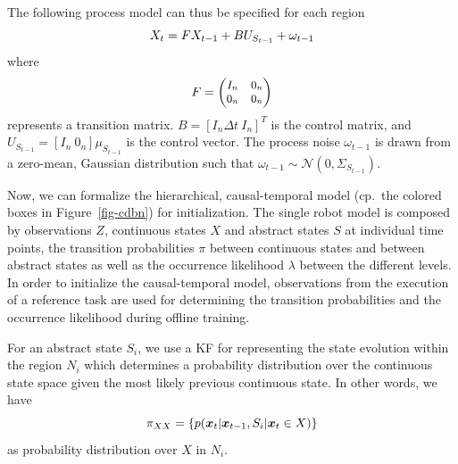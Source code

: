 \documentclass[runningheads]{llncs}
\begin{document}
The following process model can thus be specified for each region
    \begin{equation}
        \small
        X_{t} = FX_{t-1}+BU_{S_{t-1}}+\omega_{t-1}
        \label{eq-process-model}
    \end{equation}
    where 
    \begin{equation}
        \small
        F = 
        \begin{pmatrix}
        I_n & 0_n \\
        0_n & 0_n 
        \end{pmatrix}
    \end{equation}
    represents a transition matrix. 
    $B = [I_n \Delta t \ I_n]^T $ is the control matrix, and $U_{S_{t-1}}=[I_n \ 0_n]\mu_{S_{t-1}}$ is the control vector. The process noise $\omega_{t-1}$ is drawn from a zero-mean, Gaussian distribution such that $\omega_{t-1} \sim \mathcal{N}(0,\Sigma_{S_{t-1}})$.

   Now, we can formalize the hierarchical, causal-temporal model (cp.~the colored boxes in Figure~\ref{fig-cdbn}) for initialization. The single robot model is composed by observations $Z$, continuous states $X$ and abstract states $S$ at individual time points, the transition probabilities $\pi$ between continuous states and between abstract states as well as the occurrence likelihood $\lambda$ between the different levels. In order to initialize the causal-temporal model, observations from the execution of a reference task are used for determining the transition probabilities and the occurrence likelihood during offline training.
    
    For an abstract state $S_i$, we use a KF for representing the state evolution within the region $N_i$ which determines a probability distribution over the continuous state space given the most likely previous continuous state. In other words, we have
    \begin{equation}
        \small
        \pi_{XX} = \{p(\bm{x}_t|\bm{x}_{t-1}, S_{i} | \bm{x}_t \in X)\}
        \label{eq_process-model2}
    \end{equation}
    as probability distribution over $X$ in $N_i$.
\end{document}
